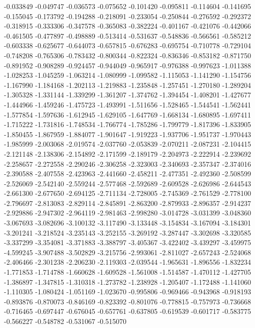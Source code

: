 -0.033849
-0.049747
-0.036573
-0.075652
-0.101420
-0.095811
-0.114604
-0.141695
-0.155045
-0.173792
-0.194288
-0.218091
-0.233054
-0.250844
-0.276592
-0.292372
-0.318915
-0.333306
-0.347578
-0.365083
-0.382224
-0.401167
-0.421076
-0.442066
-0.461505
-0.477897
-0.498889
-0.513414
-0.531637
-0.548836
-0.566561
-0.585212
-0.603338
-0.625677
-0.644073
-0.657815
-0.676283
-0.695754
-0.710778
-0.729104
-0.748208
-0.765306
-0.783432
-0.800344
-0.822324
-0.836346
-0.853182
-0.871750
-0.891952
-0.908289
-0.924457
-0.944049
-0.965917
-0.976388
-0.997623
-1.011388
-1.028253
-1.045259
-1.063214
-1.080999
-1.099582
-1.115053
-1.141290
-1.154756
-1.167990
-1.184168
-1.202113
-1.219883
-1.235848
-1.257451
-1.270180
-1.289204
-1.305328
-1.331144
-1.339299
-1.361207
-1.374762
-1.394454
-1.408201
-1.427677
-1.444966
-1.459246
-1.475723
-1.493991
-1.511656
-1.528465
-1.544541
-1.562441
-1.577854
-1.597636
-1.612945
-1.629105
-1.647769
-1.668134
-1.680895
-1.697411
-1.715222
-1.731816
-1.748534
-1.766774
-1.785286
-1.799779
-1.817396
-1.833905
-1.850455
-1.867959
-1.884077
-1.901647
-1.919223
-1.937706
-1.951737
-1.970443
-1.985999
-2.003068
-2.019574
-2.037760
-2.053839
-2.070211
-2.087231
-2.104415
-2.121148
-2.138306
-2.154892
-2.171599
-2.189179
-2.204973
-2.222914
-2.239692
-2.258657
-2.272558
-2.290246
-2.306258
-2.323003
-2.340693
-2.357347
-2.374016
-2.390588
-2.407558
-2.423963
-2.441660
-2.458211
-2.477351
-2.492360
-2.508599
-2.526069
-2.542140
-2.559244
-2.577468
-2.592689
-2.609528
-2.626986
-2.644543
-2.661300
-2.677650
-2.694125
-2.711134
-2.728005
-2.745369
-2.761529
-2.778100
-2.796697
-2.813083
-2.829114
-2.845891
-2.863200
-2.879933
-2.896357
-2.914237
-2.929886
-2.947302
-2.964119
-2.981463
-2.998280
-3.014728
-3.031399
-3.048360
-3.067693
-3.082696
-3.100132
-3.117490
-3.133448
-3.154834
-3.167094
-3.184301
-3.201241
-3.218524
-3.235143
-3.252155
-3.269192
-3.287447
-3.302698
-3.320585
-3.337299
-3.354081
-3.371883
-3.388797
-3.405367
-3.422402
-3.439297
-3.459975
-4.599245
-3.907488
-3.502829
-3.215756
-2.993061
-2.811027
-2.657243
-2.524068
-2.406466
-2.301238
-2.206230
-2.119303
-2.039544
-1.965631
-1.896556
-1.832234
-1.771853
-1.714788
-1.660628
-1.609528
-1.561008
-1.514587
-1.470112
-1.427705
-1.386897
-1.347815
-1.310318
-1.273782
-1.238928
-1.205407
-1.172488
-1.141060
-1.110305
-1.080424
-1.051169
-1.023670
-0.995806
-0.969466
-0.943968
-0.918193
-0.893876
-0.870073
-0.846169
-0.823392
-0.801076
-0.778815
-0.757973
-0.736668
-0.716465
-0.697447
-0.676045
-0.657761
-0.637805
-0.619539
-0.601717
-0.583775
-0.566227
-0.548782
-0.531067
-0.515070
